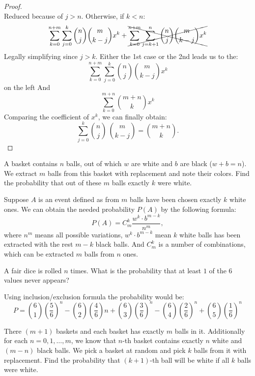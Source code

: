 \documentclass[12pt]{report}
\begin{document}
\begin{proof}
\[    \]
    Reduced because of $j > n$. Otherwise, if $k < n$:
    \[
        \sum\limits_{k=0}^{n+m} \sum\limits_{j=0}^k \binom{n}{j}\binom{m}{k-j} x^k + \xcancel{\sum\limits_{k=0}^{n+m} \sum\limits_{j = k+1}^n \binom{n}{j}\binom{m}{k-j} x^k}  
    \]
    Legally simplifying since $j > k$. Either the 1st case or the 2nd leads us to the:
    \[
        \sum\limits_{k=0}^{n+m} \sum\limits_{j=0}^k \binom{n}{j}\binom{m}{k-j} x^k  
    \]
    on the left And
    \[
        \sum\limits_{k=0}^{m+n} \binom{m+n}{k} x^k
    \]
    Comparing the coefficient of $x^k$, we can finally obtain:
    \[
        \sum\limits_{j=0}^k \binom{n}{j}\ \binom{m}{k-j} = \binom{m+n}{k}. 
    \]
\end{proof}

\begin{problem}{}
    A basket contains $n$ balls, out of which $w$ are white and $b$ are black ($w + b  = n$). We extract $m$ balls from this basket with replacement and note their colors. Find the probability that out of these $m$ balls exactly $k$ were white. 
\end{problem}

\begin{solution}
    Suppose $A$ is an event defined as from $m$ balls have been chosen exactly $k$ white ones. We can obtain the needed probability $P(A)$ by the following formula:
    \[
        P(A) = C_m^k \dfrac{w^k \cdot b^{m-k}}{n^m},  
    \]
    where $n^m$ means all possible variations, $w^k\cdot b^{m-k}$ mean $k$ white balls has been extracted with the rest $m-k$ black balls. And $C_m^k$ is a number of combinations, which can be extracted $m$ balls from $n$ ones. 
\end{solution}

\begin{problem}{}
    A fair dice is rolled $n$ times. What is the probability that at least $1$ of the $6$ values never appears?
\end{problem}

\begin{solution}
    Using inclusion/exclusion formula the probability would be:
    \[
        P =  \binom{6}{1}\left(\dfrac{5}{6}\right)^n - \binom{6}{2}\left(\dfrac{4}{6}\right)n + \binom{6}{3}\left(\dfrac{3}{6}\right)^n - \binom{6}{4}\left(\dfrac{2}{6}\right)^n + \binom{6}{5}\left(\dfrac{1}{6}\right)^n 
    \]
\end{solution}

\begin{problem}{}
    There $(m+1)$ baskets and each basket has exactly $m$ balls in it. Additionally for each $n = 0, 1,\ldots, m$, we know that $n$-th basket contains exactly $n$ white and $(m-n)$ black balls. We pick a basket at random and pick $k$ balls from it with replacement. Find the probability that $(k+1)$-th ball will be white if all $k$ balls were white.
\end{problem}
\end{document}
